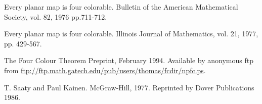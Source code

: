 \Ref

  {Every planar map is four colorable.}
{Bulletin of the American Mathematical Society,} {vol. 82, 1976
  pp.711-712.}

  {Every planar map is four colorable.}
{Illinois Journal of Mathematics,} {vol. 21, 1977, pp. 429-567.}


 {The Four
  Colour Theorem} {Preprint,}{ February 1994. Available by anonymous ftp
  from \url{ftp://ftp.math.gatech.edu/pub/users/thomas/fcdir/npfc.ps}.}

 {T. Saaty and Paul
  Kainen.}  {McGraw-Hill, 1977. Reprinted by Dover Publications 1986.}
